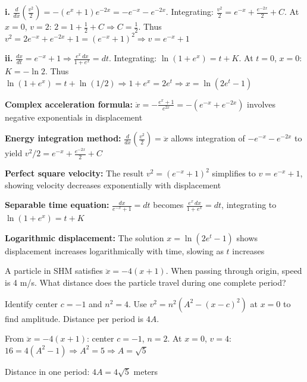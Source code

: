 \begin{solution}
\textbf{i.} $\frac{d}{dx}\left(\frac{v^2}{2}\right) = -(e^x+1)e^{-2x} = -e^{-x} - e^{-2x}$. Integrating: $\frac{v^2}{2} = e^{-x} + \frac{e^{-2x}}{2} + C$. At $x=0$, $v=2$: $2 = 1 + \frac{1}{2} + C \Rightarrow C = \frac{1}{2}$. Thus $v^2 = 2e^{-x} + e^{-2x} + 1 = (e^{-x}+1)^2 \Rightarrow v = e^{-x} + 1$ 

\textbf{ii.} $\frac{dx}{dt} = e^{-x} + 1 \Rightarrow \frac{e^x\,dx}{1+e^x} = dt$. Integrating: $\ln(1+e^x) = t + K$. At $t=0$, $x=0$: $K = -\ln 2$. Thus $\ln(1+e^x) = t + \ln(1/2) \Rightarrow 1 + e^x = 2e^t \Rightarrow x = \ln(2e^t - 1)$ 
\end{solution}

\begin{takeaways}
\item \textbf{Complex acceleration formula:} $\ddot{x} = -\frac{e^x+1}{e^{2x}} = -(e^{-x} + e^{-2x})$ involves negative exponentials in displacement
\item \textbf{Energy integration method:} $\frac{d}{dx}\left(\frac{v^2}{2}\right) = \ddot{x}$ allows integration of $-e^{-x} - e^{-2x}$ to yield $v^2/2 = e^{-x} + \frac{e^{-2x}}{2} + C$
\item \textbf{Perfect square velocity:} The result $v^2 = (e^{-x}+1)^2$ simplifies to $v = e^{-x} + 1$, showing velocity decreases exponentially with displacement
\item \textbf{Separable time equation:} $\frac{dx}{e^{-x}+1} = dt$ becomes $\frac{e^x\,dx}{1+e^x} = dt$, integrating to $\ln(1+e^x) = t + K$
\item \textbf{Logarithmic displacement:} The solution $x = \ln(2e^t - 1)$ shows displacement increases logarithmically with time, slowing as $t$ increases
\end{takeaways}

\begin{problem}
A particle in SHM satisfies $\ddot{x} = -4(x+1)$. When passing through origin, speed is 4 m/s. What distance does the particle travel during one complete period?
\end{problem}

\begin{hint}
Identify center $c = -1$ and $n^2 = 4$. Use $v^2 = n^2(A^2 - (x-c)^2)$ at $x = 0$ to find amplitude. Distance per period is $4A$.
\end{hint}

\begin{solution}
From $\ddot{x} = -4(x+1)$: center $c = -1$, $n = 2$. At $x = 0$, $v = 4$: $16 = 4(A^2 - 1) \Rightarrow A^2 = 5 \Rightarrow A = \sqrt{5}$

Distance in one period: $4A = 4\sqrt{5}$ meters
\end{solution}

